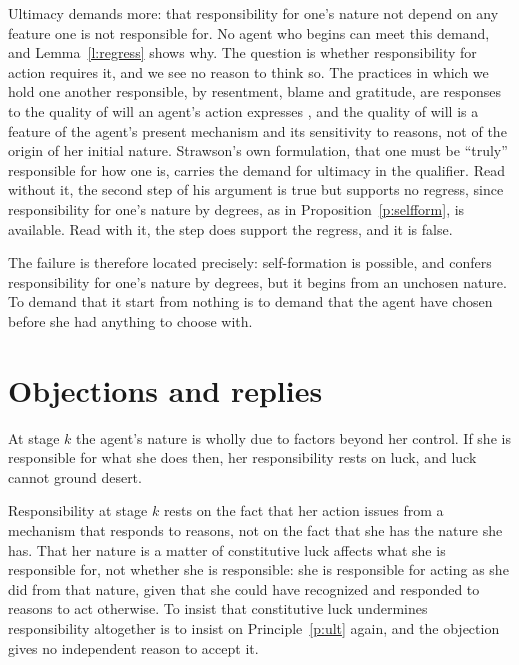 \documentclass{situationist-preprint}
\begin{document}
Ultimacy demands more: that responsibility for one's nature not depend on any feature one is not responsible for. No agent who begins can meet this demand, and Lemma~\ref{l:regress} shows why. The question is whether responsibility for action requires it, and we see no reason to think so. The practices in which we hold one another responsible, by resentment, blame and gratitude, are responses to the quality of will an agent's action expresses \citep{Strawson1962}, and the quality of will is a feature of the agent's present mechanism and its sensitivity to reasons, not of the origin of her initial nature. Strawson's own formulation, that one must be \enquote{truly} responsible for how one is, carries the demand for ultimacy in the qualifier. Read without it, the second step of his argument is true but supports no regress, since responsibility for one's nature by degrees, as in Proposition~\ref{p:selfform}, is available. Read with it, the step does support the regress, and it is false.

The failure is therefore located precisely: self-formation is possible, and confers responsibility for one's nature by degrees, but it begins from an unchosen nature. To demand that it start from nothing is to demand that the agent have chosen before she had anything to choose with.

\section{Objections and replies}\label{s:obj}

\begin{objection}
At stage $k$ the agent's nature is wholly due to factors beyond her control. If she is responsible for what she does then, her responsibility rests on luck, and luck cannot ground desert.
\end{objection}

\begin{reply}
Responsibility at stage $k$ rests on the fact that her action issues from a mechanism that responds to reasons, not on the fact that she has the nature she has. That her nature is a matter of constitutive luck \citep{Nagel1979} affects what she is responsible for, not whether she is responsible: she is responsible for acting as she did from that nature, given that she could have recognized and responded to reasons to act otherwise. To insist that constitutive luck undermines responsibility altogether is to insist on Principle~\ref{p:ult} again, and the objection gives no independent reason to accept it.
\end{reply}
\end{document}
